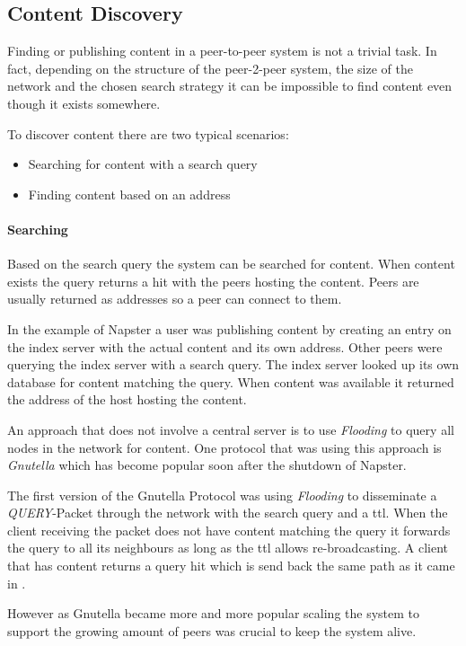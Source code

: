 \subsection{Content Discovery}
Finding or publishing content in a peer-to-peer system is not a trivial task. In fact, depending on the structure of the peer-2-peer system, the size of the network and the chosen search strategy it can be impossible to find content even though it exists somewhere.

To discover content there are two typical scenarios:
\begin{itemize}
  \item Searching for content with a search query
  \item Finding content based on an address
\end{itemize}

\paragraph{Searching}
Based on the search query the system can be searched for content. When content exists the query returns a hit with the peers hosting the content. Peers are usually returned as addresses so a peer can connect to them.

In the example of Napster a user was publishing content by creating an entry on the index server with the actual content and its own address. Other peers were querying the index server with a search query. The index server looked up its own database for content matching the query. When content was available it returned the address of the host hosting the content. 

An approach that does not involve a central server is to use \textit{Flooding} to query all nodes in the network for content. One protocol that was using this approach is \textit{Gnutella} which has become popular soon after the shutdown of Napster.

The first version of the Gnutella Protocol was using \textit{Flooding} to disseminate a \textit{QUERY}-Packet through the network with the search query and a \gls{ttl}. When the client receiving the packet does not have content matching the query it forwards the query to all its neighbours as long as the \gls{ttl} allows re-broadcasting. A client that has content returns a query hit which is send back the same path as it came in \cite[\S4]{gnutella04}.

However as Gnutella became more and more popular scaling the system to support the growing amount of peers was crucial to keep the system alive.  \cite[\S3.1]{gnutellaAnalysis}

